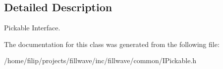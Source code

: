 \subsection{Detailed Description}
Pickable Interface. 

The documentation for this class was generated from the following file\+:\begin{DoxyCompactItemize}
\item 
/home/filip/projects/fillwave/inc/fillwave/common/I\+Pickable.\+h\end{DoxyCompactItemize}
